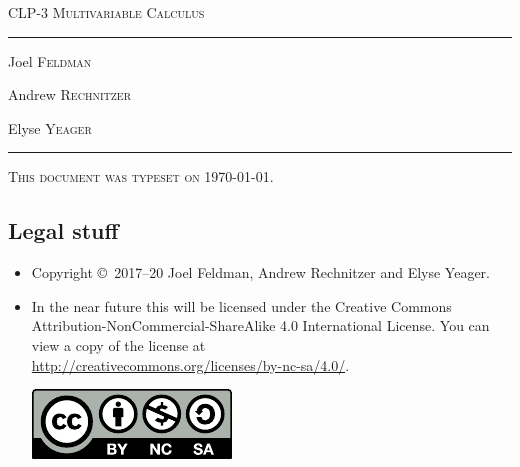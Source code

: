 \documentclass[12pt,letterpaper, openany]{book}
\begin{document}
\setcounter{page}{0}

\begin{titlepage} 
\begin{center} 
\textsc{\LARGE
CLP-3 Multivariable Calculus
}\\[2ex]

\vspace{5ex}
\hrule
\vspace{5ex}

\begin{minipage}[t]{0.3\textwidth} \begin{flushleft}
\large Joel \textsc{Feldman}
\end{flushleft} \end{minipage}%
\begin{minipage}[t]{0.3\textwidth} \begin{flushleft}
\large Andrew \textsc{Rechnitzer}
\end{flushleft} \end{minipage}%
\begin{minipage}[t]{0.3\textwidth} \begin{flushright}
\large Elyse \textsc{Yeager}
\end{flushright} \end{minipage}%
\end{center}
\vspace{2ex}
\hrule

\vfill
\textsc{This document was typeset on \today.}
\end{titlepage}

\subsection*{Legal stuff}
\begin{itemize}
 \item Copyright \copyright\ 2017--20 Joel Feldman, Andrew Rechnitzer and Elyse Yeager.

\item In the near future this will be licensed under the 
Creative Commons Attribution-NonCommercial-ShareAlike 4.0 International 
License. You can view a copy of the license at \\
\url{http://creativecommons.org/licenses/by-nc-sa/4.0/}.
\begin{center}
 \includegraphics{by-nc-sa.pdf}
\end{center}


\end{itemize}
\end{document}
